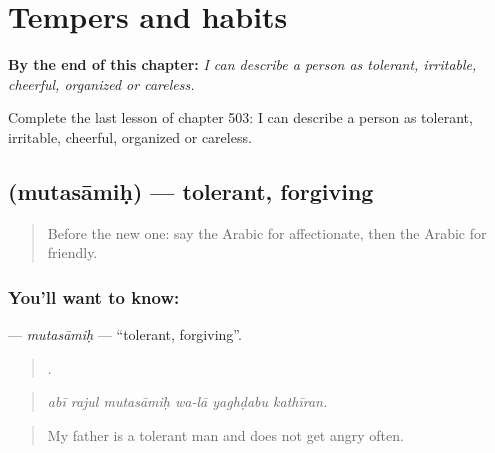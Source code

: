 
\chapter{Tempers and habits}
\label{ch:ar-tempers-and-habits}

\begin{chapteropening}
\textbf{By the end of this chapter:} \emph{I can describe a person as tolerant, irritable, cheerful, organized or careless.}

Complete the last lesson of chapter 503: I can describe a person as tolerant, irritable, cheerful, organized or careless.
\end{chapteropening}

\section[\texorpdfstring{\ar{متسامح} (mutasāmiḥ)}{متسامح (mutasāmiḥ)}]{ (mutasāmiḥ) — tolerant, forgiving}

\label{lesson:AR-C503-mutasamih}



\begin{quote}
Before the new one: say the Arabic for affectionate, then the Arabic for friendly.
\end{quote}

\subsection*{You'll want to know: }
\textbf{} — \emph{mutasāmiḥ} — \textquotedblleft{}tolerant, forgiving\textquotedblright{}.

\begin{quote}
     .
\end{quote}

\begin{quote}
\emph{abī rajul mutasāmiḥ wa-lā yaghḍabu kathīran.}
\end{quote}

\begin{quote}
My father is a tolerant man and does not get angry often.
\end{quote}

